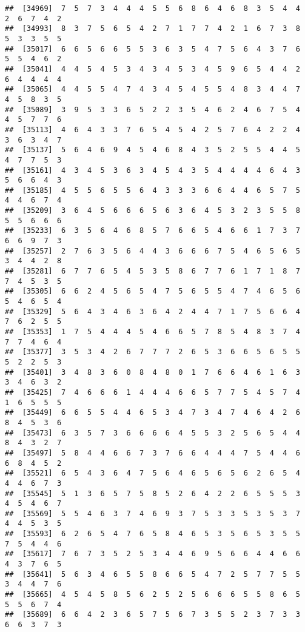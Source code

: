 \documentclass[
]{book}
\begin{document}
\begin{verbatim}
##  [34969]  7  5  7  3  4  4  4  5  5  6  8  6  4  6  8  3  5  4  4  2  6  7  4  2
##  [34993]  8  3  7  5  6  5  4  2  7  1  7  7  4  2  1  6  7  3  8  5  3  3  5  5
##  [35017]  6  6  5  6  6  5  5  3  6  3  5  4  7  5  6  4  3  7  6  5  5  4  6  2
##  [35041]  4  4  5  4  5  3  4  3  4  5  3  4  5  9  6  5  4  4  2  6  4  4  4  4
##  [35065]  4  4  5  5  4  7  4  3  4  5  4  5  5  4  8  3  4  4  7  4  5  8  3  5
##  [35089]  3  9  5  3  3  6  5  2  2  3  5  4  6  2  4  6  7  5  4  4  5  7  7  6
##  [35113]  4  6  4  3  3  7  6  5  4  5  4  2  5  7  6  4  2  2  4  3  6  3  4  7
##  [35137]  5  6  4  6  9  4  5  4  6  8  4  3  5  2  5  5  4  4  5  4  7  7  5  3
##  [35161]  4  3  4  5  3  6  3  4  5  4  3  5  4  4  4  4  6  4  3  5  6  6  4  3
##  [35185]  4  5  5  6  5  5  6  4  3  3  3  6  6  4  4  6  5  7  5  4  4  6  7  4
##  [35209]  3  6  4  5  6  6  6  5  6  3  6  4  5  3  2  3  5  5  8  5  5  6  6  6
##  [35233]  6  3  5  6  4  6  8  5  7  6  6  5  4  6  6  1  7  3  7  6  6  9  7  3
##  [35257]  2  7  6  3  5  6  4  4  3  6  6  6  7  5  4  6  5  6  5  3  4  4  2  8
##  [35281]  6  7  7  6  5  4  5  3  5  8  6  7  7  6  1  7  1  8  7  7  4  5  3  5
##  [35305]  6  6  2  4  5  6  5  4  7  5  6  5  5  4  7  4  6  5  6  5  4  6  5  4
##  [35329]  5  6  4  3  4  6  3  6  4  2  4  4  7  1  7  5  6  6  4  7  6  2  5  5
##  [35353]  1  7  5  4  4  4  5  4  6  6  5  7  8  5  4  8  3  7  4  7  7  4  6  4
##  [35377]  3  5  3  4  2  6  7  7  7  2  6  5  3  6  6  5  6  5  5  5  2  2  5  3
##  [35401]  3  4  8  3  6  0  8  4  8  0  1  7  6  6  4  6  1  6  3  3  4  6  3  2
##  [35425]  7  4  6  6  6  1  4  4  4  6  6  5  7  7  5  4  5  7  4  1  6  5  5  5
##  [35449]  6  6  5  5  4  4  6  5  3  4  7  3  4  7  4  6  4  2  6  8  4  5  3  6
##  [35473]  6  3  5  7  3  6  6  6  6  4  5  5  3  2  5  6  5  4  4  8  4  3  2  7
##  [35497]  5  8  4  4  6  6  7  3  7  6  6  4  4  4  7  5  4  4  6  6  8  4  5  2
##  [35521]  6  5  4  3  6  4  7  5  6  4  6  5  6  5  6  2  6  5  4  4  4  6  7  3
##  [35545]  5  1  3  6  5  7  5  8  5  2  6  4  2  2  6  5  5  5  3  4  5  4  6  7
##  [35569]  5  5  4  6  3  7  4  6  9  3  7  5  3  3  5  3  5  3  7  4  4  5  3  5
##  [35593]  6  2  6  5  4  7  6  5  8  4  6  5  3  5  6  5  3  5  5  7  5  4  4  6
##  [35617]  7  6  7  3  5  2  5  3  4  4  6  9  5  6  6  4  4  6  6  4  3  7  6  5
##  [35641]  5  6  3  4  6  5  5  8  6  6  5  4  7  2  5  7  7  5  5  3  4  4  7  6
##  [35665]  4  5  4  5  8  5  6  2  5  2  5  6  6  6  5  5  8  6  5  5  5  6  7  4
##  [35689]  6  6  4  2  3  6  5  7  5  6  7  3  5  5  2  3  7  3  3  6  6  3  7  3

\end{verbatim}
\end{document}
